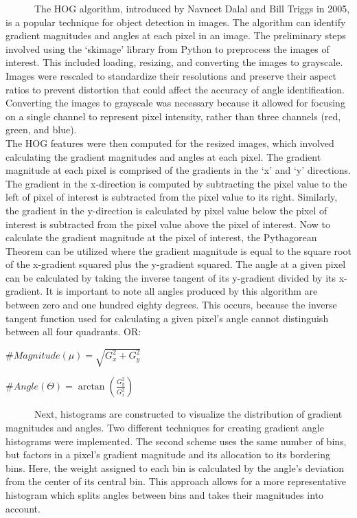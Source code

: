 \documentclass[
  letterpaper,
  DIV=11,
  numbers=noendperiod]{scrreprt}
\begin{document}
~~~~~~The HOG algorithm, introduced by Navneet Dalal and Bill Triggs in
2005, is a popular technique for object detection in images. The
algorithm can identify gradient magnitudes and angles at each pixel in
an image. The preliminary steps involved using the `skimage' library
from Python to preprocess the images of interest. This included loading,
resizing, and converting the images to grayscale. Images were rescaled
to standardize their resolutions and preserve their aspect ratios to
prevent distortion that could affect the accuracy of angle
identification. Converting the images to grayscale was necessary because
it allowed for focusing on a single channel to represent pixel
intensity, rather than three channels (red, green, and blue).\\
\hspace*{0.333em}\hspace*{0.333em}\hspace*{0.333em}\hspace*{0.333em}\hspace*{0.333em}\hspace*{0.333em}The
HOG features were then computed for the resized images, which involved
calculating the gradient magnitudes and angles at each pixel. The
gradient magnitude at each pixel is comprised of the gradients in the
`x' and `y' directions. The gradient in the x-direction is computed by
subtracting the pixel value to the left of pixel of interest is
subtracted from the pixel value to its right. Similarly, the gradient in
the y-direction is calculated by pixel value below the pixel of interest
is subtracted from the pixel value above the pixel of interest. Now to
calculate the gradient magnitude at the pixel of interest, the
Pythagorean Theorem can be utilized where the gradient magnitude is
equal to the square root of the x-gradient squared plus the y-gradient
squared. The angle at a given pixel can be calculated by taking the
inverse tangent of its y-gradient divided by its x-gradient. It is
important to note all angles produced by this algorithm are between zero
and one hundred eighty degrees. This occurs, because the inverse tangent
function used for calculating a given pixel's angle cannot distinguish
between all four quadrants. OR:

\#\(Magnitude(\mu)=\sqrt{G_{x}^{2} + G_{y}^{2}}\)

\#\(Angle(\Theta)=\arctan({\frac{G_{y}^{2}}{G_{x}^{2}}})\)

~~~~~~Next, histograms are constructed to visualize the distribution of
gradient magnitudes and angles. Two different techniques for creating
gradient angle histograms were implemented. The second scheme uses the
same number of bins, but factors in a pixel's gradient magnitude and its
allocation to its bordering bins. Here, the weight assigned to each bin
is calculated by the angle's deviation from the center of its central
bin. This approach allows for a more representative histogram which
splits angles between bins and takes their magnitudes into account.
\end{document}
